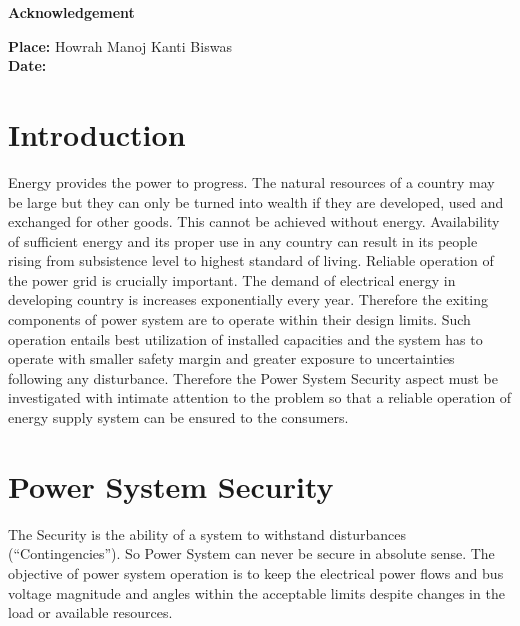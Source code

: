 \documentclass[a4paper,11pt]{article}
\begin{document}
\thispagestyle{empty}
\vspace*{2.5in}
\begin{center}
{\Large \textbf{Acknowledgement}}
\end{center}


\vspace{1in}
\textbf{Place:} Howrah \hfill Manoj Kanti Biswas\\
\textbf{Date:} \\
\clearpage

\tableofcontents
\clearpage
\section{Introduction} 
Energy provides the power to progress. The natural resources of a country may be large but they can only be turned into wealth if they are developed, used and exchanged for other goods. This cannot be achieved without energy. Availability of sufficient energy and its proper use in any country can result in its people rising from subsistence level to highest standard of living. Reliable operation of the power grid is crucially important. The demand of electrical energy in developing country is increases exponentially every year. Therefore the exiting components of power system are to operate within their design limits. Such operation entails best utilization of installed capacities and the system has to operate with smaller safety margin and greater exposure to uncertainties following any disturbance. Therefore the Power System Security aspect must be investigated with intimate attention to the problem so that a reliable operation of energy supply system can be ensured to the consumers. 

\section{Power System Security}
The Security is the ability of a system to withstand disturbances (``Contingencies''). So Power System can never be secure in absolute sense. The objective of power system operation is to keep the electrical power flows and bus voltage magnitude and angles within the acceptable limits despite changes in the load or available resources.
\end{document}
